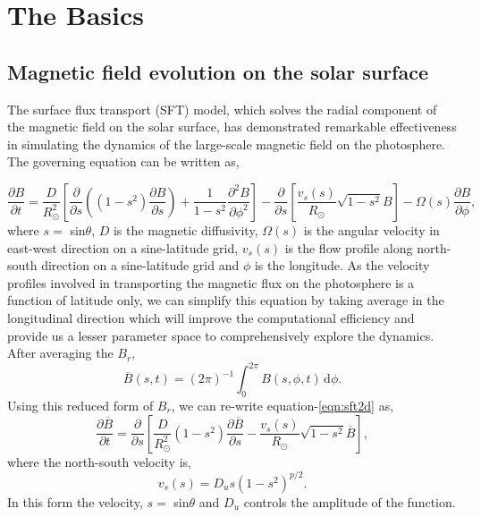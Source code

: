 \chapter{The Basics \label{chapter:basics}}

\section{Magnetic field evolution on the solar surface}


The surface flux transport (SFT) model, which solves the radial component of the magnetic field on the solar surface, has demonstrated remarkable effectiveness in simulating the dynamics of the large-scale magnetic field on the photosphere. The governing equation can be written as,

\begin{equation}
\frac{\partial B}{\partial t} = \frac{D}{R_\odot^2}\left[\frac{\partial}{\partial s}\left((1-s^2)\frac{\partial B}{\partial s}\right) + \frac{1}{1-s^2}\frac{\partial^2B}{\partial\phi^2}\right] - \frac{\partial}{\partial s}\left[\frac{v_s(s)}{R_\odot}\sqrt{1-s^2} B\right]- \Omega(s)\frac{\partial B}{\partial\phi},
\label{eqn:sft2d}
\end{equation}
where $s =$ sin$\theta$, $D$ is the magnetic diffusivity, $\Omega (s)$ is the angular velocity in east-west direction on a sine-latitude grid, $v_s (s)$ is the flow profile along north-south direction on a sine-latitude grid and $\phi$ is the longitude. As the velocity profiles involved in transporting the magnetic flux on the photosphere is a function of latitude only, we can simplify this equation by taking average in the longitudinal direction which will improve the computational efficiency and provide us a lesser parameter space to comprehensively explore the dynamics. After averaging the $B_r$, 
\begin{equation}
\overline{B}(s,t)=(2\pi)^{-1}\int_0^{2\pi}B(s,\phi,t)\,\mathrm{d}\phi.
\label{eqn:sft1d}
\end{equation}
Using this reduced form of $B_r$, we can re-write equation-\ref{eqn:sft2d} as,
\begin{equation}
\frac{\partial\overline{B}}{\partial t} = \frac{\partial}{\partial s}\left[\frac{D}{R_\odot^2}(1-s^2)\frac{\partial\overline{B}}{\partial s} - \frac{v_s(s)}{R_\odot}\sqrt{1-s^2}\overline{B}\right],
\label{eqn:evol}
\end{equation}
where the north-south velocity is,
\begin{equation}
v_s(s) = D_us(1-s^2)^{p/2}.
\label{eqn:merid}
\end{equation}
In this form the velocity, $s =$ sin$\theta$ and $D_u$ controls the amplitude of the function. 

